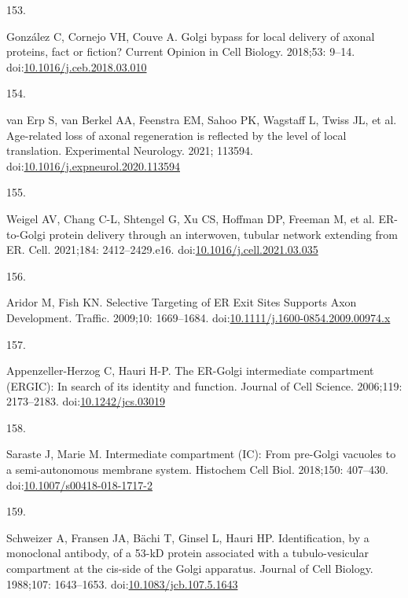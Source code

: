 \documentclass[
  12pt,
  a4paper,
]{book}
\newlength{\cslhangindent}
\newlength{\csllabelwidth}
\newenvironment{CSLReferences}[2] %
 {\begin{list}{}{%
  \setlength{\itemindent}{0pt}
  \setlength{\leftmargin}{0pt}
  \setlength{\parsep}{0pt}
  \ifodd #1
   \setlength{\leftmargin}{\cslhangindent}
   \setlength{\itemindent}{-1\cslhangindent}
  \fi
  \setlength{\itemsep}{#2\baselineskip}}}
 {\end{list}}
\newcommand{\CSLLeftMargin}[1]{\parbox[t]{\csllabelwidth}{\strut#1\strut}}
\newcommand{\CSLRightInline}[1]{\parbox[t]{\linewidth - \csllabelwidth}{\strut#1\strut}}
\begin{document}
\begin{CSLReferences}{0}{1}
\CSLLeftMargin{153. }%
\CSLRightInline{González C, Cornejo VH, Couve A. Golgi bypass for local delivery of axonal proteins, fact or fiction? Current Opinion in Cell Biology. 2018;53: 9--14. doi:\href{https://doi.org/10.1016/j.ceb.2018.03.010}{10.1016/j.ceb.2018.03.010}}

\CSLLeftMargin{154. }%
\CSLRightInline{van Erp S, van Berkel AA, Feenstra EM, Sahoo PK, Wagstaff L, Twiss JL, et al. Age-related loss of axonal regeneration is reflected by the level of local translation. Experimental Neurology. 2021; 113594. doi:\href{https://doi.org/10.1016/j.expneurol.2020.113594}{10.1016/j.expneurol.2020.113594}}

\CSLLeftMargin{155. }%
\CSLRightInline{Weigel AV, Chang C-L, Shtengel G, Xu CS, Hoffman DP, Freeman M, et al. {ER-to-Golgi} protein delivery through an interwoven, tubular network extending from {ER}. Cell. 2021;184: 2412--2429.e16. doi:\href{https://doi.org/10.1016/j.cell.2021.03.035}{10.1016/j.cell.2021.03.035}}

\CSLLeftMargin{156. }%
\CSLRightInline{Aridor M, Fish KN. Selective {Targeting} of {ER Exit Sites Supports Axon Development}. Traffic. 2009;10: 1669--1684. doi:\href{https://doi.org/10.1111/j.1600-0854.2009.00974.x}{10.1111/j.1600-0854.2009.00974.x}}

\CSLLeftMargin{157. }%
\CSLRightInline{Appenzeller-Herzog C, Hauri H-P. The {ER-Golgi} intermediate compartment ({ERGIC}): In search of its identity and function. Journal of Cell Science. 2006;119: 2173--2183. doi:\href{https://doi.org/10.1242/jcs.03019}{10.1242/jcs.03019}}

\CSLLeftMargin{158. }%
\CSLRightInline{Saraste J, Marie M. Intermediate compartment ({IC}): From pre-{Golgi} vacuoles to a semi-autonomous membrane system. Histochem Cell Biol. 2018;150: 407--430. doi:\href{https://doi.org/10.1007/s00418-018-1717-2}{10.1007/s00418-018-1717-2}}

\CSLLeftMargin{159. }%
\CSLRightInline{Schweizer A, Fransen JA, Bächi T, Ginsel L, Hauri HP. Identification, by a monoclonal antibody, of a 53-{kD} protein associated with a tubulo-vesicular compartment at the cis-side of the {Golgi} apparatus. Journal of Cell Biology. 1988;107: 1643--1653. doi:\href{https://doi.org/10.1083/jcb.107.5.1643}{10.1083/jcb.107.5.1643}}


\end{CSLReferences}
\end{document}
